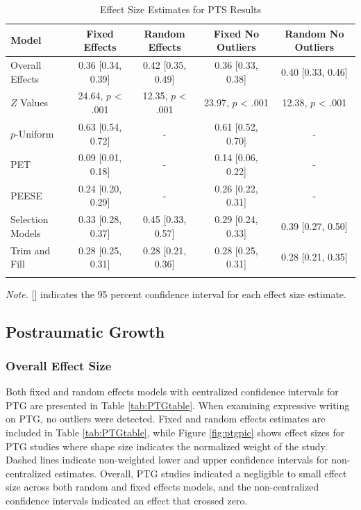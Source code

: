 \documentclass[man, mask]{apa6}
\theoremstyle{definition}
\theoremstyle{definition}
\theoremstyle{definition}
\theoremstyle{remark}
\begin{document}
\begin{table}[tbp]
\begin{center}
\begin{threeparttable}
\caption{\label{tab:PTStable}Effect Size Estimates for PTS Results}
\small{
\begin{tabular}{lcccc}
\toprule
Model & Fixed Effects & Random Effects & Fixed No Outliers & Random No Outliers\\
\midrule
Overall Effects & 0.36 [0.34, 0.39] & 0.42 [0.35, 0.49] & 0.36 [0.33, 0.38] & 0.40 [0.33, 0.46]\\
$Z$ Values & 24.64, $p$ < .001 & 12.35, $p$ < .001 & 23.97, $p$ < .001 & 12.38, $p$ < .001\\
$p$-Uniform & 0.63 [0.54, 0.72] & - & 0.61 [0.52, 0.70] & -\\
PET & 0.09 [0.01, 0.18] & - & 0.14 [0.06, 0.22] & -\\
PEESE & 0.24 [0.20, 0.29] & - & 0.26 [0.22, 0.31] & -\\
Selection Models & 0.33 [0.28, 0.37] & 0.45 [0.33, 0.57] & 0.29 [0.24, 0.33] & 0.39 [0.27, 0.50]\\
Trim and Fill & 0.28 [0.25, 0.31] & 0.28 [0.21, 0.36] & 0.28 [0.25, 0.31] & 0.28 [0.21, 0.35]\\
\bottomrule
\addlinespace
\end{tabular}
}
\begin{tablenotes}[para]
\textit{Note.} [] indicates the 95 percent confidence interval for each effect size estimate.
\end{tablenotes}
\end{threeparttable}
\end{center}
\end{table}

\subsection{Postraumatic Growth}\label{postraumatic-growth}

\subsubsection{Overall Effect Size}\label{overall-effect-size-1}

Both fixed and random effects models with centralized confidence
intervals for PTG are presented in Table \ref{tab:PTGtable}. When
examining expressive writing on PTG, no outliers were detected. Fixed
and random effects estimates are included in Table \ref{tab:PTGtable},
while Figure \ref{fig:ptgpic} shows effect sizes for PTG studies where
shape size indicates the normalized weight of the study. Dashed lines
indicate non-weighted lower and upper confidence intervals for
non-centralized estimates. Overall, PTG studies indicated a negligible
to small effect size across both random and fixed effects models, and
the non-centralized confidence intervals indicated an effect that
crossed zero.
\end{document}
